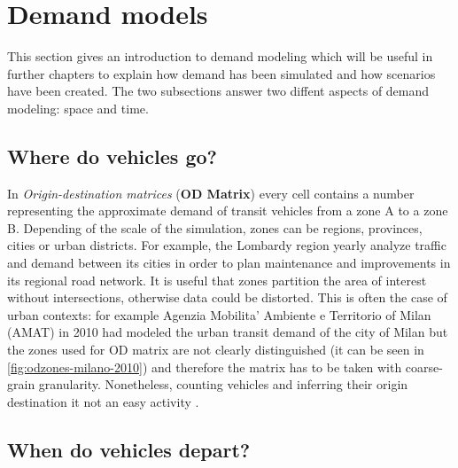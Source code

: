 \section{Demand models}

This section gives an introduction to demand modeling which will be useful in further chapters to explain how demand has been simulated and how scenarios have been created.
The two subsections answer two diffent aspects of demand modeling: space and time.

\subsection{Where do vehicles go?}

In \textit{Origin-destination matrices} (\textbf{OD Matrix}) every cell contains a number representing the approximate demand of transit vehicles from a zone A to a zone B. Depending of the scale of the simulation, zones can be regions, provinces, cities or urban districts.
For example, the Lombardy region yearly analyze traffic and demand \cite{ODLombardia2014} between its cities in order to plan maintenance and improvements in its regional road network.
It is useful that zones partition the area of interest without intersections, otherwise data could be distorted. This is often the case of urban contexts: for example Agenzia Mobilita' Ambiente e Territorio of Milan (AMAT) in 2010 \cite{ODMilano2010} had modeled the urban transit demand of the city of Milan but the zones used for OD matrix are not clearly distinguished (it can be seen in \ref{fig:odzones-milano-2010}) and therefore the matrix has to be taken with coarse-grain granularity.
Nonetheless, counting vehicles and inferring their origin destination it not an easy activity \cite{bell1983estimation}.


\subsection{When do vehicles depart?}

